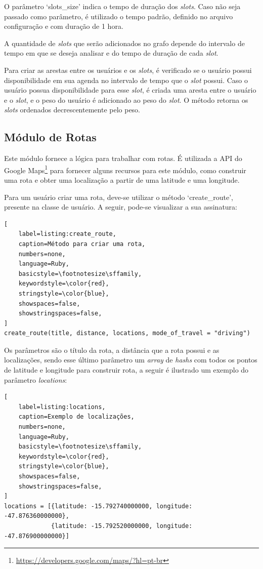 O parâmetro `slots\_size' indica o tempo de duração dos \textit{slots}. Caso não seja passado como parâmetro, é utilizado o tempo padrão, definido no arquivo configuração e com duração de 1 hora.

A quantidade de \textit{slots} que serão adicionados no grafo depende do intervalo de tempo em que se deseja analisar e do tempo de duração de cada \textit{slot}.

Para criar as arestas entre os usuários e os \textit{slots}, é verificado se o usuário possui disponibilidade em sua agenda no intervalo de tempo que o \textit{slot} possui. Caso o usuário possua disponibilidade para esse \textit{slot}, é criada uma aresta entre o usuário e o \textit{slot}, e o peso do usuário é adicionado ao peso do \textit{slot}. O método retorna os \textit{slots} ordenados decrescentemente pelo peso.

\subsection{Módulo de Rotas}

Este módulo fornece a lógica para trabalhar com rotas. É utilizada a API do Google Maps\footnote{\url{https://developers.google.com/maps/?hl=pt-br}} para fornecer alguns recursos para este módulo, como construir uma rota e obter uma localização a partir de uma latitude e uma longitude.

Para um usuário criar uma rota, deve-se utilizar o método `create\_route', presente na classe de usuário. A seguir, pode-se visualizar a sua assinatura:

\begin{lstlisting}[
    label=listing:create_route,
    caption=Método para criar uma rota,
    numbers=none,
    language=Ruby,
    basicstyle=\footnotesize\sffamily,
    keywordstyle=\color{red},
    stringstyle=\color{blue},
    showspaces=false,
    showstringspaces=false,
]
create_route(title, distance, locations, mode_of_travel = "driving")
\end{lstlisting}


Os parâmetros são o título da rota, a distância que a rota possui e as localizações, sendo esse último parâmetro um \textit{array} de \textit{hashs} com todos os pontos de latitude e longitude para construir rota, a seguir é ilustrado um exemplo do parâmetro \textit{locations}:

\begin{lstlisting}[
    label=listing:locations,
    caption=Exemplo de localizações,
    numbers=none,
    language=Ruby,
    basicstyle=\footnotesize\sffamily,
    keywordstyle=\color{red},
    stringstyle=\color{blue},
    showspaces=false,
    showstringspaces=false,
]
locations = [{latitude: -15.792740000000, longitude: -47.876360000000},
             {latitude: -15.792520000000, longitude: -47.876900000000}]
\end{lstlisting}

